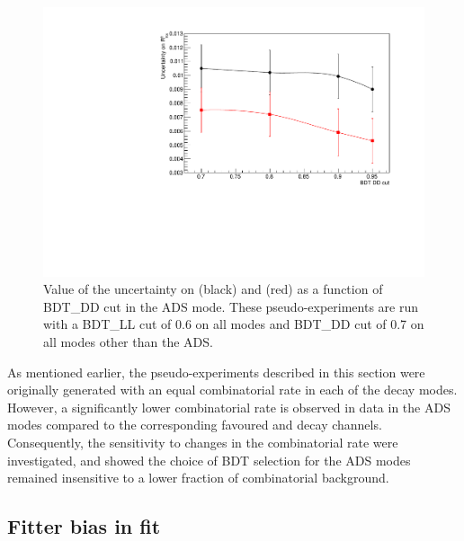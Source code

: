 \begin{figure}
\centering
\includegraphics[width=0.8\linewidth]{figures/selection/ADSoptimisation.pdf}
\caption{Value of the uncertainty on \Rptwo (black) and \Rmtwo (red) as a function of BDT\_DD cut in the ADS mode. These pseudo-experiments are run with a BDT\_LL cut of 0.6 on all modes and BDT\_DD cut of 0.7 on all modes other than the ADS.}
\label{adsoptimisation}
\end{figure}

As mentioned earlier, the pseudo-experiments described in this section were originally generated with an equal combinatorial rate in each of the \Dz decay modes. However, a significantly lower combinatorial rate is observed in data in the ADS modes compared to the corresponding favoured \kpi and \kpipipi decay channels. Consequently, the sensitivity to changes in the combinatorial rate were investigated, and showed the choice of BDT selection for the ADS modes remained insensitive to a lower fraction of combinatorial background. 

\subsection{Fitter bias in \CP fit}
\label{sec:cpfit:fitterbias}

